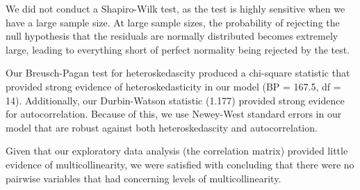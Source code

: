 \documentclass[11pt]{article} %
\begin{document}
We did not conduct a Shapiro-Wilk test, as the test is highly sensitive when we have a large sample size. At large sample sizes, the probability of rejecting the null hypothesis that the residuals are normally distributed becomes extremely large, leading to everything short of perfect normality being rejected by the test. 

Our Breusch-Pagan test for heteroskedascity produced a chi-square statistic that provided strong evidence of heteroskedasticity in our model (BP = 167.5, df = 14). Additionally, our Durbin-Watson statistic (1.177) provided strong evidence for autocorrelation. Because of this, we use Newey-West standard errors in our model that are robust against both heteroskedascity and autocorrelation. 

Given that our exploratory data analysis (the correlation matrix) provided little evidence of multicollinearity, we were satisfied with concluding that there were no pairwise variables that had concerning levels of multicollinearity.
\end{document}
